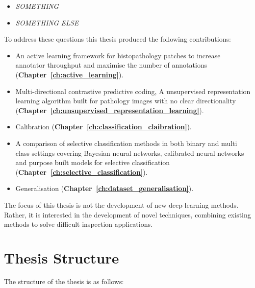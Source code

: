 \begin{itemize}
	\item \textit{SOMETHING}
	\item \textit{SOMETHING ELSE}
\end{itemize}

\noindent To address these questions this thesis produced the following contributions:

\begin{itemize}
	\item An active learning framework for histopathology patches to increase annotator throughput and maximise the number of annotations (\textbf{Chapter~\ref{ch:active_learning}}).
	
	\item Multi-directional contrastive predictive coding, A unsupervised representation learning algorithm built for pathology images with no clear directionality (\textbf{Chapter~\ref{ch:unsupervised_representation_learning}}).
	
	\item Calibration (\textbf{Chapter~\ref{ch:classification_claibration}}).
	
	\item A comparison of selective classification methods in both binary and multi class settings covering Bayesian neural networks, calibrated neural networks and purpose built models for selective classification (\textbf{Chapter~\ref{ch:selective_classification}}).
	
	\item Generalisation (\textbf{Chapter~\ref{ch:dataset_generalisation}}).
\end{itemize}

\noindent The focus of this thesis is not the development of new deep learning methods. Rather, it is interested in the development of novel techniques, combining existing methods to solve difficult inspection applications.



\section{Thesis Structure}
\label{sec:thesis_structure}
The structure of the thesis is as follows:

